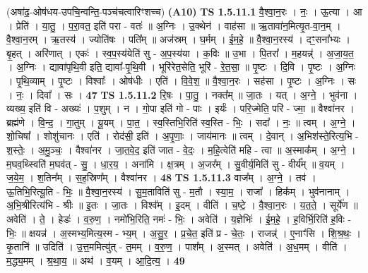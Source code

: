 \documentclass[17pt]{extarticle}
\begin{document}
                  \newline
                      (अषा॑ढ॒-ओष॑धय-उपचि॒न्वन्ति॒-पञ्च॑चत्वारिꣳशच्च)  \textbf{(A10)} \newline \newline
                                \textbf{ TS 1.5.11.1} \newline
                  वै॒श्वा॒न॒रः । नः॒ । ऊ॒त्या । आ । प्रेति॑ । या॒तु॒ । प॒रा॒वत॒ इति॑ परा - वतः॑ ॥ अ॒ग्निः । उ॒क्थेन॑ । वाह॑सा ॥ ऋ॒तावा॑न॒मित्यृ॒त-वा॒न॒म् । वै॒श्वा॒न॒रम् । ऋ॒तस्य॑ । ज्योति॑षः । पति᳚म् ॥ अज॑स्रम् । घ॒र्मम् । ई॒म॒हे॒ ॥ वै॒श्वा॒न॒रस्य॑ । दꣳ॒॒सना᳚भ्यः । बृ॒हत् । अरि॑णात् । एकः॑ । स्व॒प॒स्य॑येति॑ सु - अ॒प॒स्य॑या । क॒विः ॥ उ॒भा । पि॒तरा᳚ । म॒हयन्न्॑ । अ॒जा॒य॒त॒ । अ॒ग्निः । द्यावा॑पृथि॒वी इति॒ द्यावा᳚-पृ॒थि॒वी । भूरि॑रेत॒सेति॒ भूरि॑ - रे॒त॒सा॒ ॥ पृ॒ष्टः । दि॒वि । पृ॒ष्टः । अ॒ग्निः । पृ॒थि॒व्याम् । पृ॒ष्टः । विश्वाः᳚ । ओष॑धीः । एति॑ । वि॒वे॒श॒ ॥ वै॒श्वा॒न॒रः । सह॑सा । पृ॒ष्टः । अ॒ग्निः । सः । नः॒ । दिवा᳚ । सः । \textbf{  47} \newline
                  \newline
                                \textbf{ TS 1.5.11.2} \newline
                  रि॒षः । पा॒तु॒ । नक्त᳚म् ॥ जा॒तः । यत् । अ॒ग्ने॒ । भुव॑ना । व्यख्य॒ इति॑ वि - अख्यः॑ । प॒शुम् । न । गो॒पा इति॑ गो - पाः । इर्यः॑ । परि॒ज्मेति॒ परि॑ - ज्मा॒ ॥ वैश्वा॑नर । ब्रह्म॑णे । वि॒न्द॒ । गा॒तुम् । यू॒यम् । पा॒त॒ । स्व॒स्तिभि॒रिति॑ स्व॒स्ति - भिः॒ । सदा᳚ । नः॒ ॥ त्वम् । अ॒ग्ने॒ । शो॒चिषा᳚ । शोशु॑चानः । एति॑ । रोद॑सी॒ इति॑ । अ॒पृ॒णाः॒ । जाय॑मानः ॥ त्वम् । दे॒वान् । अ॒भिश॑स्ते॒रित्य॒भि - श॒स्तेः॒ । अ॒मु॒ञ्चः॒ । वैश्वा॑नर । जा॒त॒वे॒द॒ इति॑ जात - वे॒दः॒ । म॒हि॒त्वेति॑ महि - त्वा ॥ अ॒स्माक᳚म् । अ॒ग्ने॒ । म॒घव॒थ्स्विति॑ म॒घव॑त् - सु॒ । धा॒र॒य॒ । अना॑मि । क्ष॒त्रम् । अ॒जर᳚म् । सु॒वीर्य॒मिति॑ सु - वीर्य᳚म् ॥ व॒यम् । ज॒ये॒म॒ । श॒तिन᳚म् । स॒ह॒स्रिण᳚म् । वैश्वा॑नर । \textbf{  48} \newline
                  \newline
                                \textbf{ TS 1.5.11.3} \newline
                  वाज᳚म् । अ॒ग्ने॒ । तव॑ । ऊ॒तिभि॒रित्यू॒ति - भिः॒ ॥ वै॒श्वा॒न॒रस्य॑ । सु॒म॒ताविति॑ सु - म॒तौ । स्या॒म॒ । राजा᳚ । हिक᳚म् । भुव॑नानाम् । अ॒भि॒श्रीरित्य॑भि - श्रीः ॥ इ॒तः । जा॒तः । विश्व᳚म् । इ॒दम् । वीति॑ । च॒ष्टे॒ । वै॒श्वा॒न॒रः । य॒त॒ते॒ । सूर्ये॑ण ॥ अवेति॑ । ते॒ । हेडः॑ । व॒रु॒ण॒ । नमो॑भि॒रिति॒ नमः॑ - भिः॒ । अवेति॑ । य॒ज्ञेभिः॑ । ई॒म॒हे॒ । ह॒विर्भि॒रिति॑ ह॒विः - भिः॒ ॥ क्षयन्न॑ । अ॒स्मभ्य॒मित्य॒स्म - भ्य॒म् । अ॒सु॒र॒ । प्र॒चे॒त॒ इति॑ प्र - चे॒तः॒ । राजन्न्॑ । ए॒नाꣳ॑सि । शि॒श्र॒थः॒ । कृ॒तानि॑ ॥ उदिति॑ । उ॒त्त॒ममित्यु॑त् - त॒मम् । व॒रु॒ण॒ । पाश᳚म् । अ॒स्मत् । अवेति॑ । अ॒ध॒मम् । वीति॑ । म॒द्ध्य॒मम् । श्र॒था॒य॒ ॥ अथ॑ । व॒यम् । आ॒दि॒त्य॒ । \textbf{  49} \newline
\end{document}
